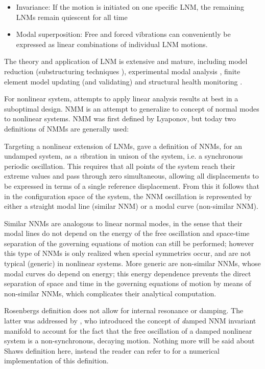 \begin{itemize}
\item Invariance: If the motion is initiated on one specific LNM, the remaining
  LNMs remain quiescent for all time
\item Modal superposition: Free and forced vibrations can conveniently be
  expressed as linear combinations of individual LNM motions.
\end{itemize}

The theory and application of LNM is extensive and mature, including model
reduction (substructuring techniques \autocite{craig1968a}), experimental modal
analysis \autocite{ewins2000a}, finite element model updating (and
validating)\autocite{friswell1995a} and structural health monitoring
\autocite{doebling1996damage}.



For nonlinear system, attempts to apply linear analysis results at best in a
suboptimal design. NMM is an attempt to generalize to concept of normal modes to
nonlinear systems. NMM was first defined by Lyaponov, but today two definitions
of NMMs are generally used:

Targeting a nonlinear extension of LNMs, \autocite{rosenberg1966a} gave a
definition of NNMs, for an undamped system, as a {\textit vibration in unison of the
  system}, i.e. a synchronous periodic oscillation. This requires that all
points of the system reach their extreme values and pass through zero
simultaneous, allowing all displacements to be expressed in terms of a single
reference displacement.
From this it follows that in the configuration space of the system, the NNM
oscillation is represented by either a straight modal line (similar NNM) or a
modal curve (non-similar NNM).

Similar NNMs are analogous to linear normal modes, in the sense that their modal
lines do not depend on the energy of the free oscillation and space-time
separation of the governing equations of motion can still be performed; however
this type of NNMs is only realized when special symmetries occur, and are not
typical (generic) in nonlinear systems. More generic are non-similar NNMs, whose
modal curves do depend on energy; this energy dependence prevents the direct
separation of space and time in the governing equations of motion by means of
non-similar NNMs, which complicates their analytical computation.


Rosenbergs definition does not allow for internal resonance or damping.  The
latter was addressed by \autocite{shaw1993a}, who introduced the concept of {\textit
  damped NNM invariant manifold} to account for the fact that the free
oscillation of a damped nonlinear system is a non-synchronous, decaying motion.
Nothing more will be said about Shaws definition here, instead the reader can
refer to \autocite{renson2014_phd} for a numerical implementation of this
definition.

